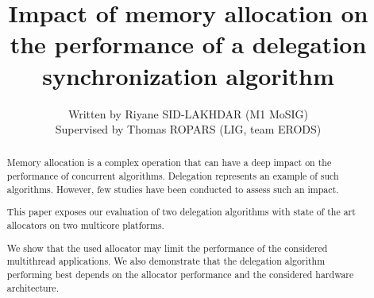 \documentclass[10pt]{article}											%
\begin{document}
\title{Impact of memory allocation on the performance of a delegation synchronization algorithm}
\author{Written by Riyane SID-LAKHDAR (M1 MoSIG)\\
Supervised by Thomas ROPARS (LIG, team ERODS)}
\maketitle








\begin{abstract}
Memory allocation is a complex operation that can have a deep impact on the performance of concurrent algorithms.   Delegation represents an example of such algorithms.   However, few studies have been conducted to assess such an impact.




This paper exposes our evaluation of two delegation algorithms with state of the art allocators on two multicore platforms.

We show that the used allocator may limit the performance of the considered multithread applications.   We also demonstrate that the delegation algorithm performing best depends on the allocator performance and the considered hardware architecture.

\end{abstract}

\end{document}
